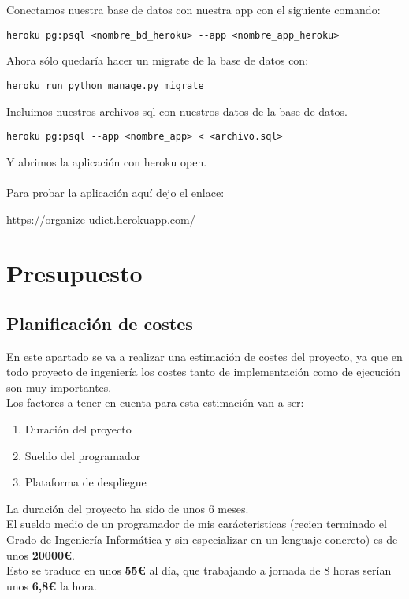 Conectamos nuestra base de datos con nuestra app con el siguiente comando:
\begin{lstlisting}
heroku pg:psql <nombre_bd_heroku> --app <nombre_app_heroku>
\end{lstlisting}

Ahora sólo quedaría hacer un migrate de la base de datos con:
\begin{lstlisting}
heroku run python manage.py migrate
\end{lstlisting}

Incluimos nuestros archivos sql con nuestros datos de la base de datos.
\begin{lstlisting}
heroku pg:psql --app <nombre_app> < <archivo.sql>
\end{lstlisting}
Y abrimos la aplicación con heroku open.\\\\

Para probar la aplicación aquí dejo el enlace:

\url{https://organize-udiet.herokuapp.com/}

\section{Presupuesto} \label{sec:coste}

\subsection{Planificación de costes}

En este apartado se va a realizar una estimación de costes del proyecto, ya que en todo proyecto de ingeniería los costes tanto de implementación como de ejecución son muy importantes.\\

Los factores a tener en cuenta para esta estimación van a ser:

\begin{enumerate}
  \item Duración del proyecto
  \item Sueldo del programador
  \item Plataforma de despliegue
\end{enumerate}

La duración del proyecto ha sido de unos 6 meses.\\

El sueldo medio de un programador \cite{sueldo} de mis carácteristicas (recien terminado el Grado de Ingeniería Informática y sin especializar en un lenguaje concreto) es de unos \textbf{20000\euro}.\\
Esto se traduce en unos \textbf{55\euro} al día, que trabajando a jornada de 8 horas serían unos \textbf{6,8\euro} la hora.\\

